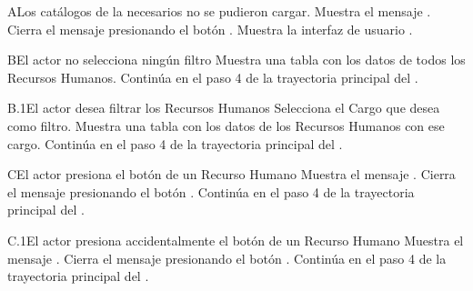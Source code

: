\begin{UCtrayectoriaA}{A}{Los catálogos de la  necesarios no se pudieron cargar.}
    \UCpaso Muestra el mensaje .
    \UCpaso[\UCactor] Cierra el mensaje presionando el botón .
    \UCpaso Muestra la interfaz de usuario .
\end{UCtrayectoriaA}
\begin{UCtrayectoriaA}{B}{El actor no selecciona ningún filtro}
    \UCpaso Muestra una tabla con los datos de todos los Recursos Humanos.
    \UCpaso Continúa en el paso 4 de la trayectoria principal del .
\end{UCtrayectoriaA}
\begin{UCtrayectoriaA}{B.1}{El actor desea filtrar los Recursos Humanos}
    \UCpaso[\UCactor] Selecciona el Cargo que desea como filtro.
    \UCpaso Muestra una tabla con los datos de los Recursos Humanos con ese cargo.
    \UCpaso Continúa en el paso 4 de la trayectoria principal del .
\end{UCtrayectoriaA}
\begin{UCtrayectoriaA}{C}{El actor presiona el botón  de un Recurso Humano}
    \UCpaso Muestra el mensaje .
    \UCpaso[\UCactor] Cierra el mensaje presionando el botón .
    \UCpaso Continúa en el paso 4 de la trayectoria principal del .
\end{UCtrayectoriaA}
\begin{UCtrayectoriaA}{C.1}{El actor presiona accidentalmente el botón  de un Recurso Humano}
    \UCpaso Muestra el mensaje .
    \UCpaso[\UCactor] Cierra el mensaje presionando el botón .
    \UCpaso Continúa en el paso 4 de la trayectoria principal del .
\end{UCtrayectoriaA}